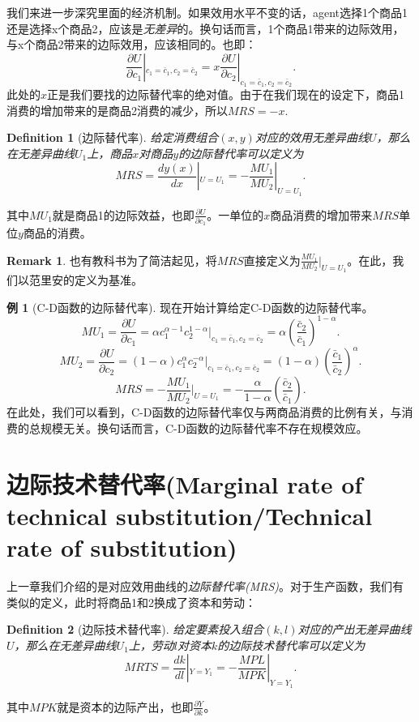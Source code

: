 \documentclass[UTF8]{ctexart}
\newtheorem{definition}{Definition}[section]
\theoremstyle{definition}
\newtheorem{example}{\kaishu 例}[section]
\newtheorem{remark}{Remark}[section]
\begin{document}
我们来进一步深究里面的经济机制。如果效用水平不变的话，agent选择1个商品1还是选择x个商品2，应该是\textit{无差异}的。换句话而言，1个商品1带来的边际效用，与x个商品2带来的边际效用，应该相同的。也即：
\[\frac{\partial U}{\partial c_1}|_{c_1=\bar c_1,c_2=\bar c_2}=x \frac{\partial U}{\partial c_2}|_{c_1=\bar c_1, c_2=\bar c_2}.\]
此处的$x$正是我们要找的边际替代率的绝对值。由于在我们现在的设定下，商品1消费的增加带来的是商品2消费的减少，所以$MRS=-x$.


\begin{definition}[边际替代率]
给定消费组合$(x,y)$对应的效用无差异曲线$U$，那么在无差异曲线$U_1$上，商品$x$对商品$y$的边际替代率可以定义为
    \[MRS=\frac{dy(x)}{dx}|_{U=U_1}=-\frac{MU_1}{MU_2}|_{U=U_1}.\]
\end{definition}
其中$MU_1$就是商品1的边际效益，也即$\frac{\partial U}{\partial c_1}$。一单位的$x$商品消费的增加带来$MRS$单位$y$商品的消费。
\begin{remark}
也有教科书为了简洁起见，将$MRS$直接定义为$\frac{MU_1}{MU_2}|_{U=U_1}$。在此，我们以范里安的定义为基准。   
\end{remark}

\begin{example}[C-D函数的边际替代率]
现在开始计算给定C-D函数的边际替代率。
\[MU_1=\frac{\partial U}{\partial c_1}=\alpha c_1^{\alpha-1}c_2^{1-\alpha}|_{c_1=\bar c_1,c_2=\bar c_2}=\alpha(\frac{\bar c_2}{\bar c_1})^{1-\alpha}.\]
\[MU_2=\frac{\partial U}{\partial c_2}=(1-\alpha)c_1^{\alpha}c_2^{-\alpha}|_{c_1=\bar c_1,c_2=\bar c_2}=(1-\alpha)(\frac{\bar c_1}{\bar c_2})^{\alpha}.\]
\[MRS=-\frac{MU_1}{MU_2}|_{U=U_1}=-\frac{\alpha}{1-\alpha}(\frac{\bar c_2}{\bar c_1}).\]
在此处，我们可以看到，C-D函数的边际替代率仅与两商品消费的比例有关，与消费的总规模无关。换句话而言，C-D函数的边际替代率不存在规模效应。
\end{example}

\section{边际技术替代率(Marginal rate of technical substitution/Technical rate of substitution)}
上一章我们介绍的是对应效用曲线的\textit{边际替代率(MRS)}。对于生产函数，我们有类似的定义，此时将商品1和2换成了资本和劳动：

\begin{definition}[边际技术替代率]
给定要素投入组合$(k,l)$对应的产出无差异曲线$U$，那么在无差异曲线$U_1$上，劳动$l$对资本$k$的边际技术替代率可以定义为
    \[MRTS=\frac{dk}{dl}|_{Y=Y_1}=-\frac{MPL}{MPK}|_{Y=Y_1}.\]
\end{definition}
其中$MPK$就是资本的边际产出，也即$\frac{\partial Y}{\partial k}$。
\end{document}
